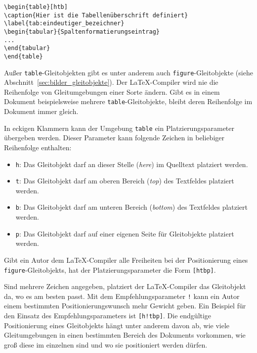 \begin{Verbatim}[frame=single]
\begin{table}[htb]
\caption{Hier ist die Tabellenüberschrift definiert}
\label{tab:eindeutiger_bezeichner}
\begin{tabular}{Spaltenformatierungseintrag}
...
\end{tabular}
\end{table}
\end{Verbatim}

Außer \verb!table!-Gleitobjekten gibt es unter anderem auch \verb!figure!-Gleitobjekte (siehe Abschnitt~\ref{sec:bilder_gleitobjekte}). Der \LaTeX-Compiler wird nie die Reihenfolge von Gleitumgebungen einer Sorte ändern. Gibt es in einem Dokument beispielsweise mehrere \verb!table!-Gleitobjekte, bleibt deren Reihenfolge im Dokument immer gleich.

In eckigen Klammern kann der Umgebung \verb!table! ein Platzierungsparameter übergeben werden. 
Dieser Parameter kann folgende Zeichen in beliebiger Reihenfolge enthalten:

\begin{itemize}
	\item \texttt{h}: Das Gleitobjekt darf an dieser Stelle  (\textsl{here}) im Quelltext platziert werden.
	\item \texttt{t}: Das Gleitobjekt darf am oberen Bereich (\textsl{top}) des Textfeldes platziert werden.
	\item \texttt{b}: Das Gleitobjekt darf am unteren Bereich (\textsl{bottom}) des Textfeldes platziert werden.
	\item \texttt{p}: Das Gleitobjekt darf auf einer eigenen Seite für Gleitobjekte platziert werden.
\end{itemize}

Gibt ein Autor dem \LaTeX-Compiler alle Freiheiten bei der Positionierung eines \verb!figure!-Gleitobjekts, hat der Platzierungsparameter die Form \verb|[htbp]|.

Sind mehrere Zeichen angegeben, platziert der \LaTeX-Compiler das Gleitobjekt da, wo es am besten passt.
Mit dem Empfehlungsparameter \verb|!| kann ein Autor einem bestimmten Positionierungswunsch mehr Gewicht geben. Ein Beispiel für den Einsatz des Empfehlungsparameters ist \verb|[h!tbp]|.
Die endgültige Positionierung eines Gleitobjekts hängt unter anderem davon ab, wie viele Gleitumgebungen in einen bestimmten Bereich des Dokuments vorkommen, wie groß diese im einzelnen sind und wo sie positioniert werden dürfen. 

